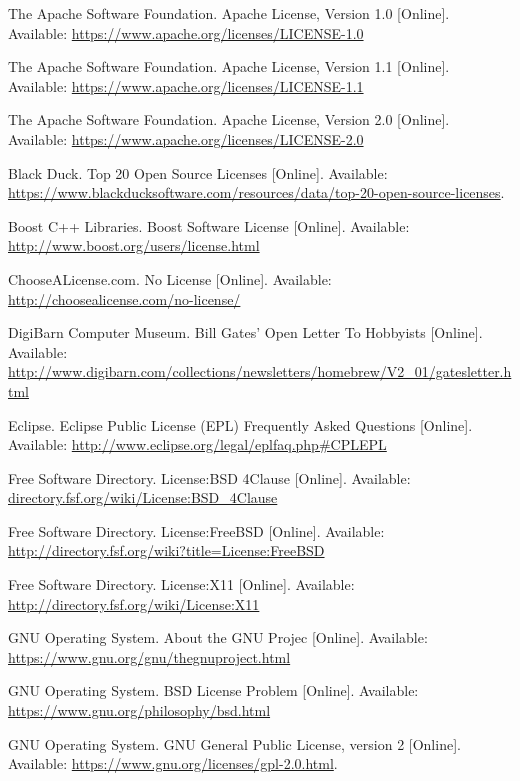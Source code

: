 \documentclass[12pt,letterpaper]{article}
\begin{document}
\begin{thebibliography}{20}

\raggedright
{} The Apache Software Foundation. Apache License, Version 1.0 [Online]. Available: \url{https://www.apache.org/licenses/LICENSE-1.0}

 The Apache Software Foundation. Apache License, Version 1.1 [Online]. Available: \url{https://www.apache.org/licenses/LICENSE-1.1}

 The Apache Software Foundation. Apache License, Version 2.0 [Online]. Available: \url{https://www.apache.org/licenses/LICENSE-2.0}

 Black Duck. Top 20 Open Source Licenses [Online]. Available: \url{https://www.blackducksoftware.com/resources/data/top-20-open-source-licenses}.

 Boost C++ Libraries. Boost Software License [Online]. Available: \url{http://www.boost.org/users/license.html}

 ChooseALicense.com. No License [Online]. Available: \url{http://choosealicense.com/no-license/}

 DigiBarn Computer Museum. Bill Gates' Open Letter To Hobbyists [Online]. Available: \url{http://www.digibarn.com/collections/newsletters/homebrew/V2_01/gatesletter.html}

 Eclipse. Eclipse Public License (EPL) Frequently Asked Questions [Online]. Available: \url{http://www.eclipse.org/legal/eplfaq.php#CPLEPL}

 Free Software Directory. License:BSD 4Clause [Online]. Available: \url{directory.fsf.org/wiki/License:BSD_4Clause}

 Free Software Directory. License:FreeBSD [Online]. Available: \url{http://directory.fsf.org/wiki?title=License:FreeBSD}

 Free Software Directory. License:X11 [Online]. Available: \url{http://directory.fsf.org/wiki/License:X11}

 GNU Operating System. About the GNU Projec [Online]. Available: \url{https://www.gnu.org/gnu/thegnuproject.html}

 GNU Operating System. BSD License Problem [Online]. Available: \url{https://www.gnu.org/philosophy/bsd.html}

 GNU Operating System. GNU General Public License, version 2 [Online]. Available: \url{https://www.gnu.org/licenses/gpl-2.0.html}.


\end{thebibliography}
\end{document}
